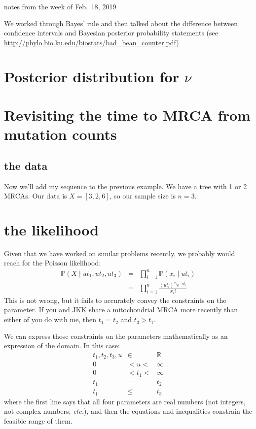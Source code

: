 \documentclass[11pt]{article}
\renewcommand{\Pr}{\mathbb{P}}
\begin{document}
notes from the week of Feb.~18, 2019 \\
\tableofcontents

We worked through Bayes' rule and then talked about the difference
between confidence intervals and Bayesian posterior probability
statements (see \url{http://phylo.bio.ku.edu/biostats/bad_bean_counter.pdf})

\section{Posterior distribution for $\nu$}

\section{Revisiting the time to MRCA from mutation counts}
\subsection{the data}
Now we'll add my sequence to the previous example.
We have a tree with 1 or 2 MRCAs.
Our data is
$X=[3,2,6]$,
so our sample size is $n=3$.

\section{the likelihood}
Given that we have worked on similar problems recently, we probably would reach
for the Poisson likelihood:
\begin{eqnarray}
\Pr(X\mid ut_1, ut_2, ut_3)& = & \prod_{i=1}^{n} \Pr(x_i\mid ut_i)\\
& = & \prod_{i=1}^{n} \frac{(ut_i)^{x_i}e^{-ut_i}}{x_i ! }
\end{eqnarray}
This is not wrong, but it fails to accurately convey the constraints on the parameter.
If you and JKK share a mitochondrial MRCA more recently than either of you do with me, then $t_1=t_2$ and $t_3> t_1$.

We can express those constraints on the parameters mathematically as an expression of the domain.
In this case: 
\begin{eqnarray}
    t_1, t_2, t_3, u & \in &  \mathbb{R}\\
    0 & < u < & \infty\\
    0 & < t_1 < & \infty\\
    t_1 & = & t_2 \\
    t_1 & \leq & t_3
\end{eqnarray}
where the first line says that all four parameters are real numbers (not integers, 
not complex numbers, {\em etc.}), and then the equations and inequalities constrain
the feasible range of them.
\end{document}
